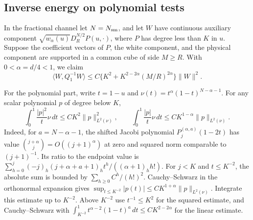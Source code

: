 \documentclass[11pt]{article}
\theoremstyle{definition}
\begin{document}
\subsection{Inverse energy on polynomial tests}
\label{app:gaussian-krylov}
In the fractional channel let \(N=N_{\rm sm}\), and let \(W\) have
continuous auxiliary component
\(\sqrt{w_\alpha(u)}D_R^{N/2}P(u,\cdot)\), where \(P\) has degree less
than \(K\) in \(u\). Suppose the coefficient vectors of \(P\), the white
component, and the physical component are supported in a common cube
of side \(M\ge R\). With \(0<\alpha=d/4<1\), we claim
\begin{equation}
 \langle W,Q_1^{-1}W\rangle
 \le C\{K^2+K^{2-2\alpha}(M/R)^{2\alpha}\}\|W\|^2 .
 \label{eq:gaussian-krylov}
\end{equation}

For the polynomial part, write \(t=1-u\) and
\(\nu(t)=t^\alpha(1-t)^{N-\alpha-1}\). For any scalar polynomial
\(p\) of degree below \(K\),
\begin{equation}
 \int_0^1 \frac{|p|^2}{t}\nu\,dt\le CK^2\|p\|_{L^2(\nu)}^2,
 \qquad
 \int_0^1 \frac{|p|}{t}\nu\,dt\le CK^{1-\alpha}\|p\|_{L^2(\nu)} .
\end{equation}
Indeed, for \(a=N-\alpha-1\), the shifted Jacobi polynomial
\(P_j^{(\alpha,a)}(1-2t)\) has value
\(\binom{j+\alpha}{j}=O((j+1)^\alpha)\) at zero and squared norm
comparable to \((j+1)^{-1}\). Its ratio to the endpoint value is
\(\sum_{h=0}^j(-j)_h(j+\alpha+a+1)_ht^h/((\alpha+1)_h h!)\).
For \(j<K\) and \(t\le K^{-2}\), the absolute sum is bounded by
\(\sum_{h\ge0} C^h/(h!)^2\). Cauchy--Schwarz in the orthonormal
expansion gives \(\sup_{t\le K^{-2}} |p(t)|\le
CK^{1+\alpha}\|p\|_{L^2(\nu)}\). Integrate this estimate up to
\(K^{-2}\). Above \(K^{-2}\) use \(t^{-1}\le K^2\) for the squared
estimate, and Cauchy--Schwarz with
\(\int_{K^{-2}}^1 t^{\alpha-2}(1-t)^a\,dt\le CK^{2-2\alpha}\)
for the linear estimate.
\end{document}
